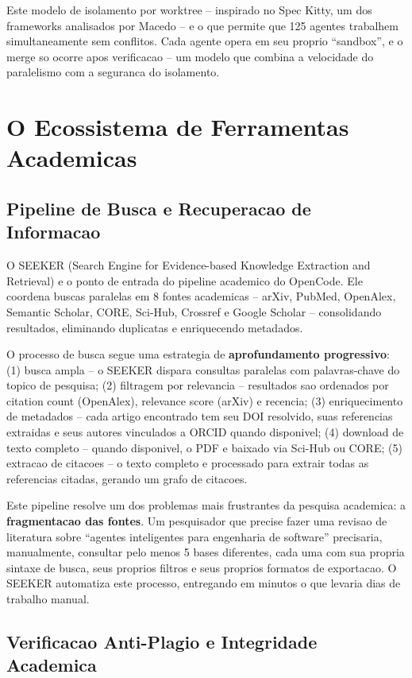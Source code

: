 \documentclass[12pt,a4paper,oneside,sumario=tradicional,chapter=TITLE,section=TITLE,subsection=TITLE,english,brazil]{abntex2}
\begin{document}
Este modelo de isolamento por worktree -- inspirado no Spec Kitty, um dos frameworks analisados por Macedo \cite{macedo2026fromprompt} -- e o que permite que 125 agentes trabalhem simultaneamente sem conflitos. Cada agente opera em seu proprio ``sandbox'', e o merge so ocorre apos verificacao -- um modelo que combina a velocidade do paralelismo com a seguranca do isolamento.

\section{O Ecossistema de Ferramentas Academicas}

\subsection{Pipeline de Busca e Recuperacao de Informacao}

O SEEKER (Search Engine for Evidence-based Knowledge Extraction and Retrieval) e o ponto de entrada do pipeline academico do OpenCode. Ele coordena buscas paralelas em 8 fontes academicas -- arXiv, PubMed, OpenAlex, Semantic Scholar, CORE, Sci-Hub, Crossref e Google Scholar -- consolidando resultados, eliminando duplicatas e enriquecendo metadados.

O processo de busca segue uma estrategia de \textbf{aprofundamento progressivo}: (1) busca ampla -- o SEEKER dispara consultas paralelas com palavras-chave do topico de pesquisa; (2) filtragem por relevancia -- resultados sao ordenados por citation count (OpenAlex), relevance score (arXiv) e recencia; (3) enriquecimento de metadados -- cada artigo encontrado tem seu DOI resolvido, suas referencias extraidas e seus autores vinculados a ORCID quando disponivel; (4) download de texto completo -- quando disponivel, o PDF e baixado via Sci-Hub ou CORE; (5) extracao de citacoes -- o texto completo e processado para extrair todas as referencias citadas, gerando um grafo de citacoes.

Este pipeline resolve um dos problemas mais frustrantes da pesquisa academica: a \textbf{fragmentacao das fontes}. Um pesquisador que precise fazer uma revisao de literatura sobre ``agentes inteligentes para engenharia de software'' precisaria, manualmente, consultar pelo menos 5 bases diferentes, cada uma com sua propria sintaxe de busca, seus proprios filtros e seus proprios formatos de exportacao. O SEEKER automatiza este processo, entregando em minutos o que levaria dias de trabalho manual.

\subsection{Verificacao Anti-Plagio e Integridade Academica}
\end{document}
